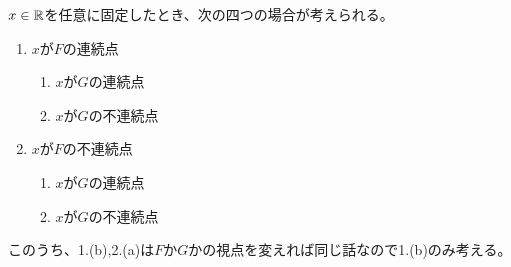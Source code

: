     $x \in {\mathbb{R}}$を任意に固定したとき、次の四つの場合が考えられる。
    \begin{enumerate}
      \item $x$が$F$の連続点
        \begin{enumerate}
          \item $x$が$G$の連続点
          \item $x$が$G$の不連続点
        \end{enumerate}
      \item $x$が$F$の不連続点
        \begin{enumerate}
          \item $x$が$G$の連続点
          \item $x$が$G$の不連続点
        \end{enumerate}
    \end{enumerate}
    このうち、1.(b),2.(a)は$F$か$G$かの視点を変えれば同じ話なので1.(b)のみ考える。
